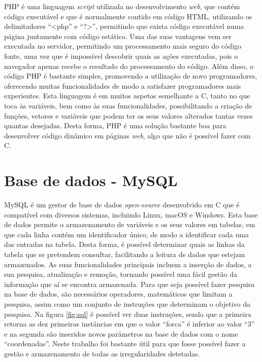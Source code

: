 PHP é uma linguagem \emph{script} utilizada no desenvolvimento \emph{web}, que contém código executável e que é normalmente contido em código HTML, utilizando os delimitadores ``<php'' e ``?>'', permitindo que exista código executável numa página juntamente com código estático.
Uma das suas vantagens vem ser executada no servidor, permitindo um processamento mais seguro do código fonte, uma vez que é impossível descobrir quais as ações executadas, pois o navegador apenas recebe o resultado do processamento do código.
Além disso, o código PHP é bastante simples, promovendo a utilização de novo programadores, oferecendo muitas funcionalidades de modo a satisfazer programadores mais experientes.
Esta linguagem é em muitos aspetos semelhante a C, tanto no que toca às variáveis, bem como às suas funcionalidades, possibilitando a criação de funções, vetores e variáveis que podem ter os seus valores alterados tantas vezes quantas desejadas.
Desta forma, PHP é uma solução bastante boa para desenvolver código dinâmico em páginas \emph{web}, algo que não é possível fazer com C.

\section{Base de dados - MySQL}
\label{sec:MySQL}

MySQL é um gestor de base de dados \emph{open-source} desenvolvido em C que é compatível com diversos sistemas, incluindo Linux, macOS e Windows.
Esta base de dados permite o armazenamento de variáveis e os seus valores em tabelas, em que cada linha contém um identificador único, de modo a identificar cada uma das entradas na tabela.
Desta forma, é possível determinar quais as linhas da tabela que se pretendem consultar, facilitando a leitura de dados que estejam armazenados.
As suas funcionalidades principais incluem a inserção de dados, a sua pesquisa, atualização e remoção, tornando possível uma fácil gestão da informação que aí se encontra armazenada.
Para que seja possível fazer pesquisa na base de dados, são necessários operadores, matemáticos que limitam a pesquisa, assim como um conjunto de instruções que determinam o objetivo da pesquisa.
Na figura \ref{fig:sql} é possível ver duas instruções, sendo que a primeira retorna as dez primeiras instâncias em que o valor ``forca'' é inferior ao valor ``3'' e na segunda são inseridos novos parâmetros na base de dados com o nome ``coordenadas''.
Neste trabalho foi bastante útil para que fosse possível fazer a gestão e armazenamento de todas as irregularidades detetadas.

